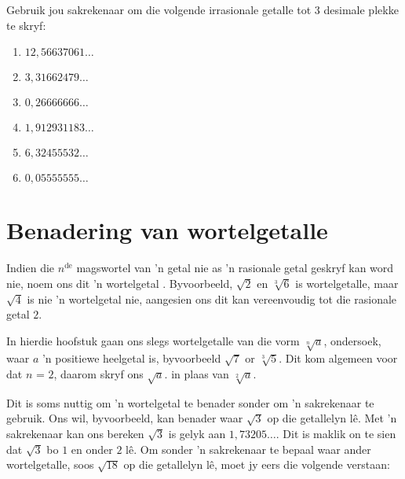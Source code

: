 \begin{exercises}{}
{
Gebruik jou sakrekenaar om die volgende irrasionale getalle tot $3$ desimale plekke te skryf:
\begin{enumerate}[itemsep=5pt, label=\textbf{\arabic*}. ]
\item $12,56637061\ldots$ %
\item $3,31662479\ldots$ %
\item $0,26666666\ldots$ %
\item $1,912931183\ldots$ %
\item $6,32455532\ldots$ %
\item $0,05555555\ldots$ %
\end{enumerate}

}
\end{exercises}


\section{Benadering van wortelgetalle}

Indien die ${n}^{\mathrm{de}}$ magswortel van ’n getal nie as ’n rasionale getal geskryf kan word nie,  noem ons dit ’n wortelgetal . Byvoorbeeld, $\sqrt{2}$ en $\sqrt[3]{6}$ is wortelgetalle, maar $\sqrt{4}$ is nie ’n wortelgetal nie, aangesien ons dit kan vereenvoudig tot die rasionale getal $2$.\par 
In hierdie hoofstuk gaan ons slegs wortelgetalle van die vorm $\sqrt[n]{a}$, ondersoek, waar  $a$ ’n positiewe heelgetal is, byvoorbeeld $\sqrt{7}$ or $\sqrt[3]{5}$. Dit kom algemeen voor dat $n$ = $2$, daarom skryf ons $\sqrt{a}$. in plaas van $\sqrt[2]{a}$.\par 
Dit is soms nuttig om ’n wortelgetal te benader sonder om ’n sakrekenaar te gebruik. Ons wil, byvoorbeeld, kan benader waar $\sqrt{3}$ op die getallelyn lê. Met ’n sakrekenaar kan ons bereken $\sqrt{3}$ is gelyk aan $1,73205\ldots$. Dit is maklik on te sien dat $\sqrt{3}$ bo $1$ en onder $2$ lê. Om sonder ’n sakrekenaar te bepaal waar ander wortelgetalle, soos $\sqrt{18}$ op die getallelyn lê, moet jy eers die volgende verstaan:\par 


      
